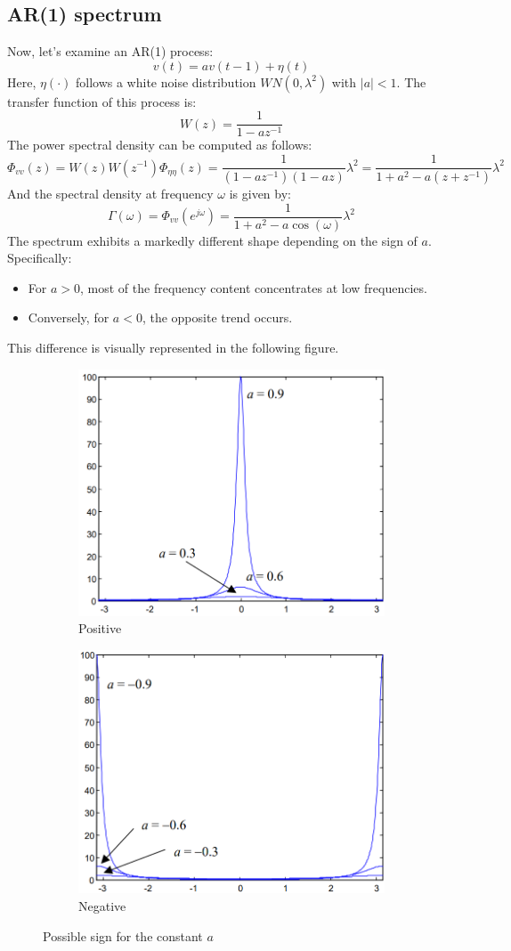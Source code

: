 \subsection{AR(1) spectrum}
Now, let's examine an AR(1) process:
\[v(t)=av(t-1)+\eta(t)\]
Here, $\eta(\cdot)$ follows a white noise distribution $WN(0,\lambda^2)$ with $\left\lvert a \right\rvert < 1$. 
The transfer function of this process is:
\[W(z)=\dfrac{1}{1-az^{-1}}\]
The power spectral density can be computed as follows:
\[\Phi_{vv}(z)=W(z)W(z^{-1})\Phi_{\eta\eta}(z)=\dfrac{1}{\left( 1-az^{-1} \right)\left( 1-az \right)}\lambda^2=\dfrac{1}{1+a^2-a(z+z^{-1})}\lambda^2\]
And the spectral density at frequency $\omega$ is given by:
\[\Gamma(\omega)=\Phi_{vv}(e^{j\omega})=\dfrac{1}{1+a^2-a\cos(\omega)}\lambda^2\]
The spectrum exhibits a markedly different shape depending on the sign of $a$.
Specifically:
\begin{itemize}
    \item For $a>0$, most of the frequency content concentrates at low frequencies.
    \item Conversely, for $a<0$, the opposite trend occurs.
\end{itemize}
This difference is visually represented in the following figure. 
\begin{figure}[H]
    \centering
    \begin{subfigure}{0.49\textwidth}
        \centering
        \includegraphics[width=0.6\linewidth]{images/ap.png} 
        \caption{Positive}
    \end{subfigure}
    \begin{subfigure}{0.49\textwidth}
        \centering
        \includegraphics[width=0.6\linewidth]{images/an.png}
        \caption{Negative}
    \end{subfigure}
    \caption{Possible sign for the constant $a$}
\end{figure}

